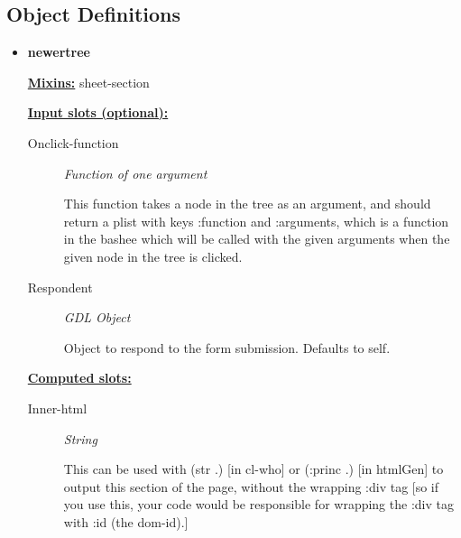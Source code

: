 \documentclass [11pt]{book}
\begin{document}
\label{sec:tree(treecomponentusedbytastyandpotentiallyasauicomponentonitsown)}





\subsection{Object Definitions}




\begin{itemize}

\item {}
\label{prim:newertree}
\textbf{newertree}


\textbf{
\underline{Mixins:}} sheet-section






\textbf{
\underline{Input slots (optional):}}

\begin{description}

\item [Onclick-function]
\emph{Function of one argument}

 This function takes a node in the tree as an argument, and should return
a plist with keys :function and :arguments, which is a function in the bashee which will be called
with the given arguments when the given node in the tree is clicked.




\item [Respondent]
\emph{GDL Object}

 Object to respond to the form submission. Defaults to self.




\end{description}






\textbf{
\underline{Computed slots:}}

\begin{description}

\item [Inner-html]
\emph{String}

 This can be used with (str .) [in cl-who] or (:princ .) [in htmlGen]
to output this section of the page, without the wrapping :div tag [so if you use this,
your code would be responsible for wrapping the :div tag with :id (the dom-id).]





\end{description}
\end{itemize}
\end{document}
